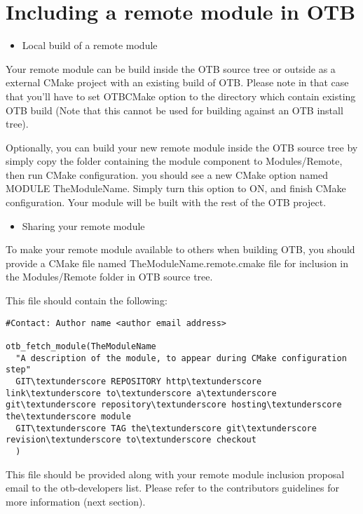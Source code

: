 \section{Including a remote module in OTB}
\begin{itemize}
       \item Local build of a remote module  
\end{itemize}

Your remote module can be build inside the OTB source tree or outside as a
external CMake project with an existing build of OTB. Please note in that case
that you'll have to set OTB\textunderscoreDIR CMake option to the directory which contain
existing OTB build (Note that this cannot be used for building against an OTB install
tree).

Optionally, you can build your new remote module inside the OTB source tree by simply copy
the folder containing the module component to Modules/Remote, then run CMake
configuration. you should see a new CMake option named MODULE\textunderscore
TheModuleName. Simply turn this option to ON, and finish CMake
configuration. Your module will be built with the rest of the OTB project.

\begin{itemize}
       \item  Sharing your remote module 
\end{itemize}

To make your remote module available to others when building OTB, you should
provide a CMake file named TheModuleName.remote.cmake file for inclusion in the
Modules/Remote folder in OTB source tree.

This file should contain the following: 

\begin{verbatim}
#Contact: Author name <author email address>

otb_fetch_module(TheModuleName
  "A description of the module, to appear during CMake configuration step"
  GIT\textunderscore REPOSITORY http\textunderscore link\textunderscore to\textunderscore a\textunderscore git\textunderscore repository\textunderscore hosting\textunderscore the\textunderscore module
  GIT\textunderscore TAG the\textunderscore git\textunderscore revision\textunderscore to\textunderscore checkout
  )
\end{verbatim}
This file should be provided along with your remote module inclusion proposal email to the otb-developers list. Please refer to the contributors guidelines for more information (next section). 

